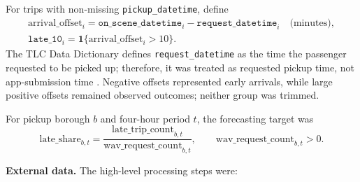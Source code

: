 \documentclass[11pt]{article}
\begin{document}
For trips with non-missing \texttt{pickup\_datetime}, define
\begingroup
\setlength{\abovedisplayskip}{4pt}
\setlength{\belowdisplayskip}{4pt}
\begin{equation*}
    \begin{gathered}
        \mathrm{arrival\_offset}_i
            = \texttt{on\_scene\_datetime}_i
            - \texttt{request\_datetime}_i
            \quad \text{(minutes)}, \\
        \texttt{late\_10}_i
            = \mathbf{1}\{\mathrm{arrival\_offset}_i > 10\}.
    \end{gathered}
\end{equation*}
\endgroup
The TLC Data Dictionary defines \texttt{request\_datetime} as the time the
passenger requested to be picked up; therefore, it was treated as requested
pickup time, not app-submission time \cite{nyctlc_hvfhv_dictionary}.
Negative offsets represented early arrivals, while large positive offsets
remained observed outcomes; neither group was trimmed.

For pickup borough \(b\) and four-hour period \(t\), the forecasting target was
\begingroup
\setlength{\abovedisplayskip}{2pt}
\setlength{\belowdisplayskip}{2pt}
\begin{equation*}
    \mathrm{late\_share}_{b,t}
        = \frac{\mathrm{late\_trip\_count}_{b,t}}
        {\mathrm{wav\_request\_count}_{b,t}},
        \qquad \mathrm{wav\_request\_count}_{b,t} > 0.
\end{equation*}
\endgroup

\textbf{External data.}
The high-level processing steps were:
\end{document}

